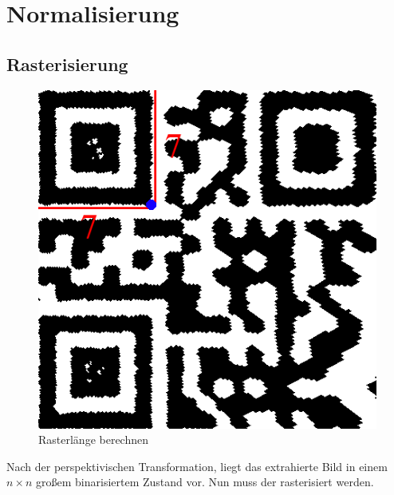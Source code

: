 \chapter{Normalisierung}
\section{Rasterisierung}

\begin{figure}
  \vspace{-20pt}
  \begin{center}
    \includegraphics[scale=0.25]{images/Gitter_step.png}
  \end{center}
  \vspace{-10pt}
  \label{fig:raster-qrcode}\caption{Rasterlänge berechnen}
  \vspace{-10pt}
\end{figure}

Nach der perspektivischen Transformation, liegt das extrahierte Bild in einem $n\times n$ großem binarisiertem Zustand vor. Nun muss der \QRCode rasterisiert werden.

